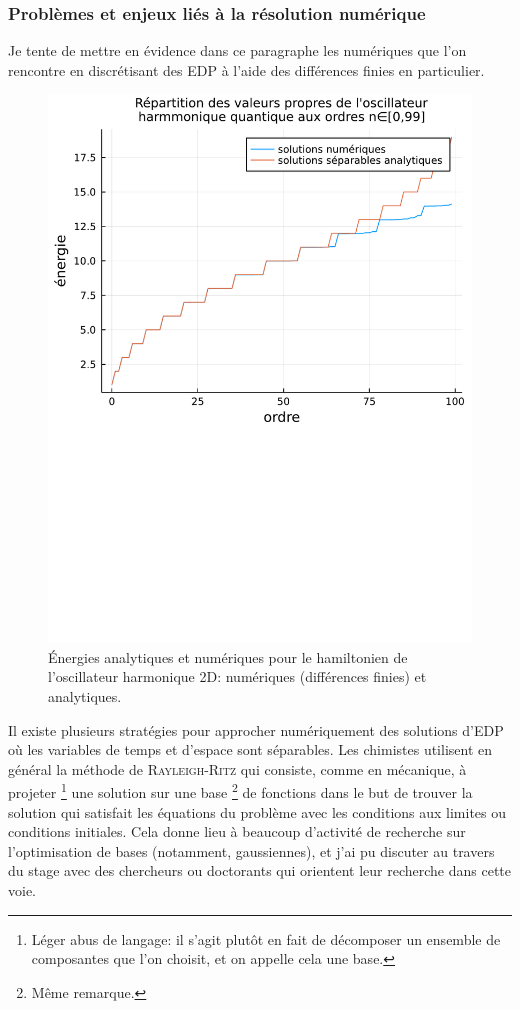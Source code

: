 \documentclass[svgnames,dvipsnames,a4paper,10pt,french]{report}
\begin{document}
 
 \subsubsection{Problèmes et enjeux liés à la résolution numérique}
 
 \label{pb_et_enjeux_lies_resol}
 
 Je tente de mettre en évidence dans ce paragraphe les numériques que l'on rencontre en discrétisant des EDP à l'aide des différences finies en particulier.
 \begin{figure}
    \centering
    \includegraphics[width=.6\textwidth]{images/formes_résol_OHQ_2D/énergies_osc_harm2D_div.pdf}
    \caption{Énergies analytiques et numériques pour le hamiltonien de l'oscillateur harmonique 2D: numériques (différences finies) et analytiques.}
    \label{fig:en_lap_2D}
\end{figure}




 
Il existe plusieurs stratégies pour approcher numériquement des solutions d'EDP où les variables de temps et d'espace sont séparables. Les chimistes utilisent en général la méthode de \textsc{Rayleigh-Ritz} qui consiste, comme en mécanique, à \og projeter \fg{}\footnote{Léger abus de langage: il s'agit plutôt en fait de décomposer un ensemble de composantes que l'on choisit, et on appelle cela une base.} une solution sur une \og base \fg{}\footnote{Même remarque.} de fonctions dans le but de trouver la solution qui satisfait les équations du problème avec les conditions aux limites ou conditions initiales. Cela donne lieu à beaucoup d'activité de recherche sur l'optimisation de bases (notamment, gaussiennes), et j'ai pu discuter au travers du stage avec des chercheurs ou doctorants qui orientent leur recherche dans cette voie. 
\end{document}
